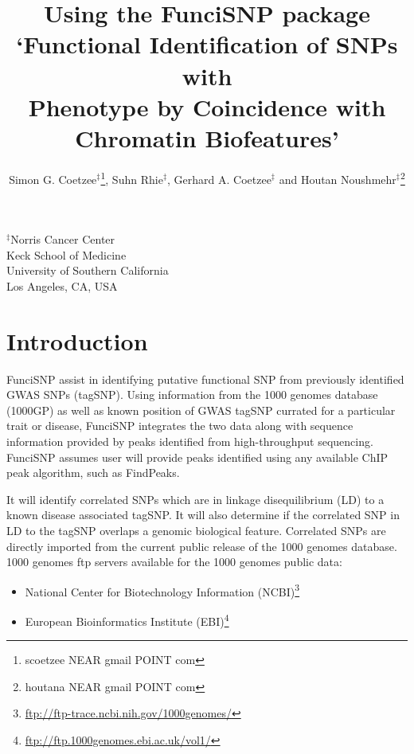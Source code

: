 \documentclass[12pt,fullpage]{article}
\author{Simon G. Coetzee$^\ddagger$\footnote{scoetzee NEAR gmail POINT com},
    Suhn Rhie$^\ddagger$, Gerhard A. Coetzee$^\ddagger$ and Houtan
        Noushmehr$^\ddagger$\footnote{houtana NEAR gmail POINT com}}
\begin{document}
\title{Using the FunciSNP package\\`Functional Identification of SNPs with\\
Phenotype by Coincidence with Chromatin Biofeatures'}
\maketitle
\begin{center}
$^\ddagger$Norris Cancer Center\\Keck School of
Medicine\\University of Southern California\\Los Angeles, CA,
USA
\end{center}
\tableofcontents
\section{Introduction}

FunciSNP assist in identifying putative functional SNP from previously
identified GWAS SNPs (tagSNP). Using information from the 1000 genomes database
(1000GP) as well as known position of GWAS tagSNP currated for a particular
trait or disease, FunciSNP integrates the two data along with sequence
information provided by peaks identified from high-throughput sequencing.
FunciSNP assumes user will provide peaks identified using any available ChIP
peak algorithm, such as FindPeaks.

It will identify correlated SNPs which are in linkage disequilibrium (LD) to a
known disease associated tagSNP. It will also determine if the correlated SNP in
LD to the tagSNP overlaps a genomic biological feature. Correlated SNPs are
directly imported from the current public release of the 1000 genomes database.
1000 genomes ftp servers available for the 1000 genomes public data: 

\begin{itemize}
\item National Center for Biotechnology Information
(NCBI)\footnote{\url{ftp://ftp-trace.ncbi.nih.gov/1000genomes/}}
\item European Bioinformatics Institute
(EBI)\footnote{\url{ftp://ftp.1000genomes.ebi.ac.uk/vol1/}}
\end{itemize}
\end{document}
